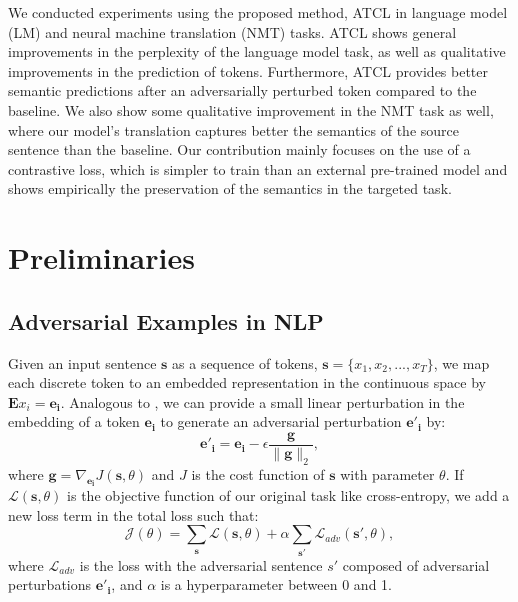 \documentclass[letterpaper]{article} %
\begin{document}

We conducted experiments using the proposed method, ATCL in language model (LM) and neural machine translation (NMT) tasks. ATCL shows general improvements in the perplexity of the language model task, as well as qualitative improvements in the prediction of tokens. Furthermore, ATCL provides better semantic predictions after an adversarially perturbed token compared to the baseline. We also show some qualitative improvement in the NMT task as well, where our model's translation captures better the semantics of the source sentence than the baseline. Our contribution mainly focuses on the use of a contrastive loss, which is simpler to train than an external pre-trained model and shows empirically the preservation of the semantics in the targeted task. 

\section{Preliminaries}

\subsection{Adversarial Examples in NLP} \label{sectionadv}


Given an input sentence $\mathbf{s}$ as a sequence of tokens, $\mathbf{s}=\{x_1, x_2, ... , x_T\}$, we map each discrete token to an embedded representation in the continuous space by $\mathbf{E}x_i = \mathbf{e_i}$. Analogous to \cite{miyato2016adversarial}, we can provide a small linear perturbation in the embedding of a token $\mathbf{e_i}$ to generate an adversarial perturbation $\mathbf{e'_i}$ by:
\begin{equation}\label{miyato}
\mathbf{e'_i} = \mathbf{e_i} -\epsilon \frac{\mathbf{g}}{\|\mathbf{g}\|_2},
\end{equation}
where $\mathbf{g} = \nabla_{\mathbf{e_i}} J(\mathbf{s}, \theta)$ and $J$ is the cost function of $\mathbf{s}$ with parameter $\theta$. If $\mathcal{L}(\mathbf{s}, \theta)$ is the objective function of our original task like cross-entropy, we add a new loss term in the total loss such that:
\begin{equation}
    \mathcal{J}(\theta) = \sum_{\mathbf{s}}\mathcal{L}(\mathbf{s}, \theta) + \alpha  \sum_{\mathbf{s'}}\mathcal{L}_{adv}(\mathbf{s'}, \theta),
\end{equation}
where $\mathcal{L}_{adv}$ is the loss with the adversarial sentence $s'$ composed of adversarial perturbations $\mathbf{e'_i}$, and $\alpha$ is a hyperparameter between 0 and 1. 
\end{document}
